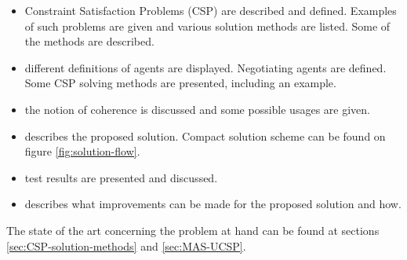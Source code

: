 \documentclass[header]{subfiles}
\begin{document}
\def\inChapter#1{In chapter \ref{chapter:#1}}
\def\showChapter#1{Chapter \ref{chapter:#1}}

\begin{itemize}[leftmargin=2.5cm]
  \item[\inChapter{csp}]
        Constraint Satisfaction Problems (CSP) are described and defined.
        Examples of such problems are given and various solution methods are
        listed. Some of the methods are described.
  \item[\inChapter{agents}]
        different definitions of agents are displayed. Negotiating agents are
        defined. Some CSP solving methods are presented, including an example.
  \item[\inChapter{Coherence}]
        the notion of coherence is discussed and some possible usages are given.
  \item[\showChapter{solution}]
        describes the proposed solution. Compact solution scheme can be found
        on figure \ref{fig:solution-flow}.
  \item[\inChapter{test}] test results are presented and discussed.
  \item[\showChapter{improvements}]
        describes what improvements can be made for the proposed solution and
        how.
\end{itemize}


\bigskip\noindent
The state of the art concerning the problem at hand can be found at sections
\ref{sec:CSP-solution-methods} and \ref{sec:MAS-UCSP}.

\end{document}
